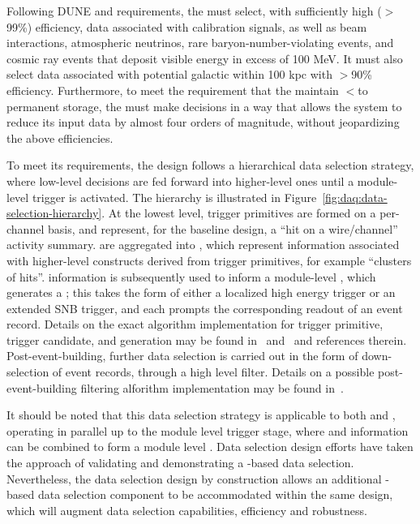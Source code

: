 Following DUNE  and  requirements, the
 must select, with sufficiently high ($>$99\%) efficiency, data associated with calibration
signals, as well as beam interactions,
atmospheric neutrinos, rare baryon-number-violating events, and cosmic
ray events that deposit visible energy in excess of 100 MeV. 
It must also select data associated with potential galactic
 within 100 kpc with $>$90\% efficiency. 
Furthermore, to meet the requirement that the   maintain
$<$\offsitepbpy to permanent storage, the 
must make  decisions in a way that allows the  
system to reduce its input data by almost four orders of magnitude,
without jeopardizing the above efficiencies.

To meet its requirements, the  design follows a hierarchical data selection strategy, where low-level decisions are fed forward into higher-level ones until a module-level trigger is activated. 
The hierarchy is illustrated in
Figure~\ref{fig:daq:data-selection-hierarchy}. 
At the lowest level, trigger primitives are formed on a per-channel basis, and represent, for the baseline design, a ``hit on a wire/channel'' activity summary. 
 are aggregated into , which represent information associated with higher-level constructs derived from trigger primitives, for example ``clusters of hits''. 
 information is subsequently used to inform a
module-level , which generates a ;
this takes the form of either a localized high energy trigger or an
extended SNB trigger, and each prompts the corresponding readout of an
event record. Details on the
exact algorithm implementation for trigger primitive, trigger
candidate, and  generation may be found
in~ and~ and references therein. 
Post-event-building, further data selection is carried out in the form
of down-selection of event records, through a high level
filter. Details on a possible post-event-building filtering alforithm
implementation may be found in~.

It should be noted that this data selection strategy is applicable to both  and , operating in parallel up to the module level trigger stage, where  and  information can be combined to form a module level . 
Data selection design efforts have taken the approach of validating
and demonstrating a -based data selection. Nevertheless,
the data selection design by construction allows an additional
-based data selection component to be accommodated within
the same design, which will augment data selection capabilities, efficiency and robustness.

